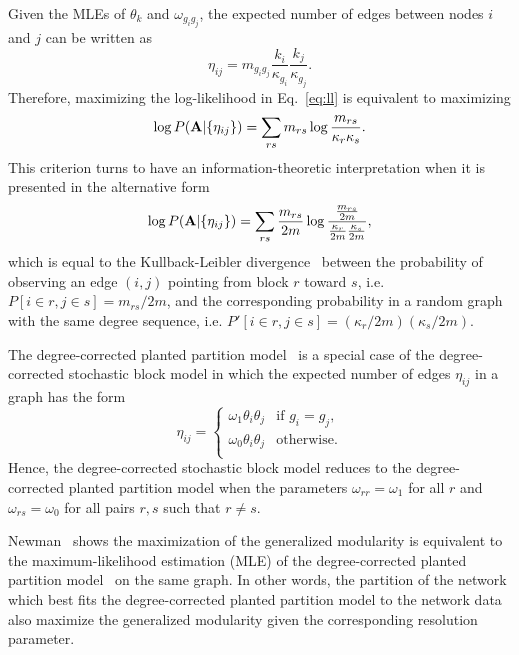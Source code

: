 Given the MLEs of $\theta_k$ and $\omega_{g_i g_j}$, the expected number of edges between nodes $i$ and $j$ can be written as
\begin{equation} \label{eq:mle_dsbm}
    \eta_{ij} = m_{g_i g_j} \frac{k_i}{\kappa_{g_i}} \frac{k_j}{\kappa_{g_j}}.
\end{equation}
Therefore, maximizing the log-likelihood in Eq.~\ref{eq:ll} is equivalent to maximizing
\begin{equation}
    \log P({\bf A}|\{\eta_{ij}\}) = \sum_{rs} m_{rs} \log \frac{m_{rs}}{\kappa_{r}\kappa_{s}}.
\end{equation}
This criterion turns to have an information-theoretic interpretation when it is presented in the alternative form 
\begin{equation} \label{eq:KL_divergence}
     \log P({\bf A}|\{\eta_{ij}\}) = \sum_{rs} \frac{m_{rs}}{2m} \log \frac{ \frac{m_{rs}}{2m} }{\frac{\kappa_{r}}{2m} \frac{\kappa_{s}}{2m}},
\end{equation}
which is equal to the Kullback-Leibler divergence~\cite{kullback1951information} between the probability of observing an edge $(i, j)$ pointing from block $r$ toward $s$, i.e. $P[i\in r, j\in s] = m_{rs}/{2m}$, and the corresponding probability in a random graph with the same degree sequence, i.e. $P' [i\in r, j\in s] = (\kappa_{r}/2m)(\kappa_{s}/{2m})$.

The degree-corrected planted partition model~\cite{newman2016equivalence} is a special case of the degree-corrected stochastic block model in which the expected number of edges $\eta_{ij}$ in a graph has the form
\begin{equation} \label{eq:pp_form}
\eta_{ij} = 
    \begin{cases}
         \omega_{1} \theta_i \theta_j    & \text{if  } g_i = g_j,  \\
         \omega_{0} \theta_i \theta_j  & \text{otherwise}. \\
    \end{cases}
\end{equation}
Hence, the degree-corrected stochastic block model reduces to the degree-corrected planted partition model when the parameters $\omega_{rr} = \omega_1$ for all $r$ and $\omega_{rs} = \omega_0$ for all pairs $r,s$ such that $r\neq s$.

Newman~\cite{newman2016equivalence} shows the maximization of the generalized modularity is equivalent to the maximum-likelihood estimation (MLE) of the degree-corrected planted partition model~\cite{karrer2011stochastic} on the same graph. In other words, the partition of the network which best fits the degree-corrected planted partition model to the network data also maximize the generalized modularity given the corresponding resolution parameter.

